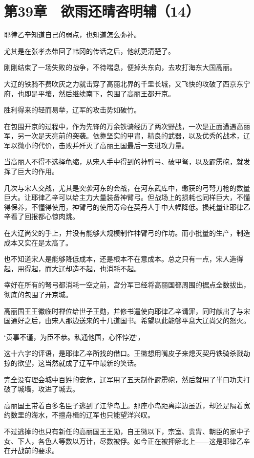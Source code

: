 \section{第39章　欲雨还晴咨明辅（14）}

耶律乙辛知道自己的弱点，也知道怎么弥补。

尤其是在张孝杰带回了韩冈的传话之后，他就更清楚了。

刚刚结束了一场失败的战争，不待喘息，便掉头东向，去攻打海东大国高丽。

大辽的铁骑不费吹灰之力就击穿了高丽北界的千里长城，又飞快的攻破了西京东宁府，也即是平壤，然后继续南下，包围了高丽王都开京。

胜利得来的轻而易举，辽军的攻击势如破竹。

在包围开京的过程中，作为先锋的万余铁骑经历了两次野战，一次是正面遭遇高丽军，另一次是天亮前的突袭。依靠坚实的甲胄，精良的武器，以及优秀的战术，辽军以微小的代价，击败并歼灭了高丽王国最后一支进攻力量。

当高丽人不得不选择龟缩，从宋人手中得到的神臂弓、破甲弩，以及霹雳砲，就发挥了巨大的作用。

几次与宋人交战，尤其是突袭河东的会战，在河东武库中，缴获的弓弩刀枪的数量巨大。让耶律乙辛可以给主力大量装备神臂弓。但战场上的损耗也同样巨大，不懂得保养，不懂得使用，神臂弓的使用寿命在契丹人手中大幅降低。损耗量让耶律乙辛看了回报都心惊肉跳。

在大辽尚父的手上，并没有能够大规模制作神臂弓的作坊。而小批量的生产，制造成本又实在是太高了。

也不知道宋人是能够降低成本，还是根本不在意成本。总之只有一点，宋人造得起，用得起，而大辽却造不起，也消耗不起。

幸好在所有的弩弓都消耗一空之前，宫分军已经将高丽国都周围的据点全数拔出，彻底的包围了开京城。

高丽国王王徽临时禅位给世子王勋，并修书遣使向耶律乙辛请罪，同时献出了与宋国通好之后，由宋人那边送来的十几道国书。希望以此能够平息大辽尚父的怒火。

‘贡事不谨，为臣不恭。私通他国，心怀悖逆’，

这十六字的评语，是耶律乙辛所找的借口。王徽想用嘴皮子来熄灭契丹铁骑杀戮劫掠的欲望，这当然就成了辽军中最新的笑话。

完全没有理会城中百姓的安危，辽军用了五天制作霹雳砲，然后就用了半曰功夫打破了城墙，攻进了城去。

高丽国王带着百多名臣子逃到了江华岛上。那座小岛距离岸边虽近，却还是隔着宽约数里的海水，不擅舟楫的辽军也只能望洋兴叹。

不过逃掉的也只有新任的高丽国王王勋，自王徽以下，宗室、贵胄、朝臣的家中子女、下人，各色人等数以万计，尽数被俘。如今正在被押解北上——这是耶律乙辛在开战前的要求。

